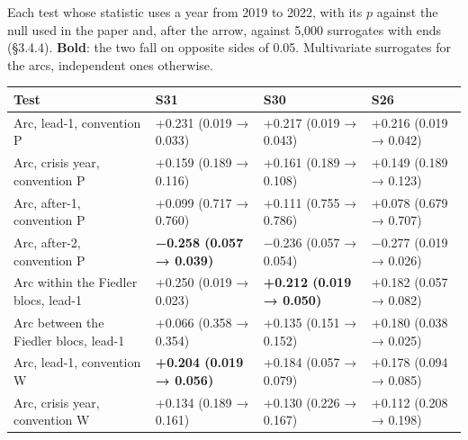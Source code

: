 \documentclass[11pt,a4paper]{article}
\newcounter{none}                    %
\begin{document}
Each test whose statistic uses a year from 2019 to 2022, with its \(p\) against the null used in the paper and, after the arrow, against 5,000 surrogates with ends (§3.4.4). \textbf{Bold}: the two fall on opposite sides of 0.05. Multivariate surrogates for the arcs, independent ones otherwise.

{\def\LTcaptype{none} %
\begin{longtable}[]{@{}
  >{\raggedright\arraybackslash}p{}
  >{\raggedright\arraybackslash}p{}
  >{\raggedright\arraybackslash}p{}
  >{\raggedright\arraybackslash}p{}@{}}
\toprule\noalign{}
\begin{minipage}[b]{\linewidth}\raggedright
Test
\end{minipage} & \begin{minipage}[b]{\linewidth}\raggedright
S31
\end{minipage} & \begin{minipage}[b]{\linewidth}\raggedright
S30
\end{minipage} & \begin{minipage}[b]{\linewidth}\raggedright
S26
\end{minipage} \\
\midrule\noalign{}
\endhead
\bottomrule\noalign{}
\endlastfoot
Arc, lead-1, convention P & +0.231 (0.019 → 0.033) & +0.217 (0.019 → 0.043) & +0.216 (0.019 → 0.042) \\
Arc, crisis year, convention P & +0.159 (0.189 → 0.116) & +0.161 (0.189 → 0.108) & +0.149 (0.189 → 0.123) \\
Arc, after-1, convention P & +0.099 (0.717 → 0.760) & +0.111 (0.755 → 0.786) & +0.078 (0.679 → 0.707) \\
Arc, after-2, convention P & \textbf{−0.258 (0.057 → 0.039)} & −0.236 (0.057 → 0.054) & −0.277 (0.019 → 0.026) \\
Arc within the Fiedler blocs, lead-1 & +0.250 (0.019 → 0.023) & \textbf{+0.212 (0.019 → 0.050)} & +0.182 (0.057 → 0.082) \\
Arc between the Fiedler blocs, lead-1 & +0.066 (0.358 → 0.354) & +0.135 (0.151 → 0.152) & +0.180 (0.038 → 0.025) \\
Arc, lead-1, convention W & \textbf{+0.204 (0.019 → 0.056)} & +0.184 (0.057 → 0.079) & +0.178 (0.094 → 0.085) \\
Arc, crisis year, convention W & +0.134 (0.189 → 0.161) & +0.130 (0.226 → 0.167) & +0.112 (0.208 → 0.198) \\

\end{longtable}}
\end{document}
